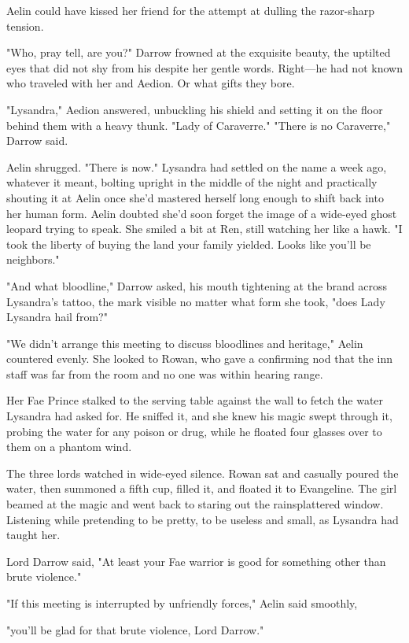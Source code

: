 Aelin could have kissed her friend for the attempt at dulling the razor-sharp tension.

"Who, pray tell, are you?" Darrow frowned at the exquisite beauty, the uptilted eyes that did not shy from his despite her gentle words. Right---he had not known who traveled with her and Aedion. Or what gifts they bore.

"Lysandra," Aedion answered, unbuckling his shield and setting it on the floor behind them with a heavy thunk. "Lady of Caraverre." "There is no Caraverre," Darrow said.

Aelin shrugged. "There is now." Lysandra had settled on the name a week ago, whatever it meant, bolting upright in the middle of the night and practically shouting it at Aelin once she'd mastered herself long enough to shift back into her human form. Aelin doubted she'd soon forget the image of a wide-eyed ghost leopard trying to speak. She smiled a bit at Ren, still watching her like a hawk. "I took the liberty of buying the land your family yielded. Looks like you'll be neighbors."

"And what bloodline," Darrow asked, his mouth tightening at the brand across Lysandra's tattoo, the mark visible no matter what form she took, "does Lady Lysandra hail from?"

"We didn't arrange this meeting to discuss bloodlines and heritage," Aelin countered evenly. She looked to Rowan, who gave a confirming nod that the inn staff was far from the room and no one was within hearing range.

Her Fae Prince stalked to the serving table against the wall to fetch the water Lysandra had asked for. He sniffed it, and she knew his magic swept through it, probing the water for any poison or drug, while he floated four glasses over to them on a phantom wind.

The three lords watched in wide-eyed silence. Rowan sat and casually poured the water, then summoned a fifth cup, filled it, and floated it to Evangeline. The girl beamed at the magic and went back to staring out the rainsplattered window. Listening while pretending to be pretty, to be useless and small, as Lysandra had taught her.

Lord Darrow said, "At least your Fae warrior is good for something other than brute violence."

"If this meeting is interrupted by unfriendly forces," Aelin said smoothly,

"you'll be glad for that brute violence, Lord Darrow."

